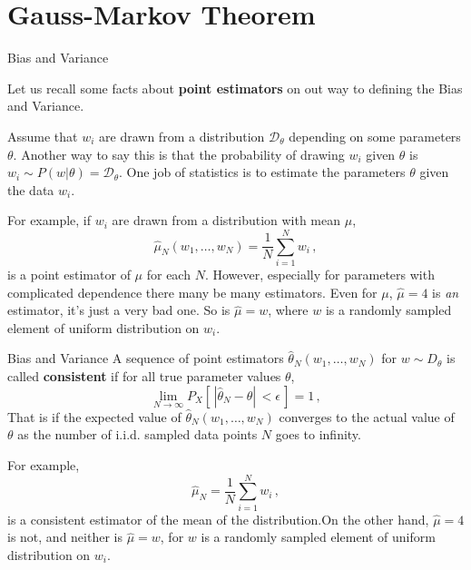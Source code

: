 \documentclass[10pt, table, dvipsnames,xcdraw,handout]{beamer}
\begin{document}
\section{Gauss-Markov Theorem}







\begin{frame}[fragile]{Bias and Variance} 

Let us recall some facts about \textbf{point estimators} on out way to defining the Bias and Variance. 

Assume that $w_i$ are drawn from a distribution $\mathcal{D}_\theta$ depending on some parameters $\theta$. Another way to say this is that the probability of drawing $w_i$ given $\theta$ is $w_i \sim P(w|\theta) =\mathcal{D}_\theta$. One job of statistics is to estimate the parameters $\theta$ given the data $w_i$. 

For example, if $w_i$ are drawn from a distribution with mean $\mu$,
$$
\hat{\mu}_N(w_1,\ldots, w_N) = \frac{1}{N} \sum_{i=1}^N w_i\,,
$$
is a point estimator of $\mu$ for each $N$. However, especially for parameters with complicated dependence there many be many estimators. Even for $\mu$, $\hat{\mu} = 4$ is \emph{an} estimator, it's just a very bad one. So is $\hat{\mu} = w$, where $w$ is a randomly sampled element of uniform distribution on $w_i$. 
 
\end{frame}



\begin{frame}[fragile]{Bias and Variance} 
A sequence of point estimators $\hat{\theta}_N(w_1,\ldots, w_N)$ for $w\sim D_\theta$ is called \textbf{consistent} if for all true parameter values $\theta$,
$$
\lim_{N\to \infty} P_X[\,| \hat{\theta}_N - \theta|\,<\epsilon\,] = 1\,,
$$
That is if the expected value of $\hat{\theta}_N(w_1,\ldots, w_N)$ converges to the actual value of $\theta$ as the number of i.i.d. sampled data points $N$ goes to infinity. \pause

For example, 
$$
\hat{\mu}_N = \frac{1}{N} \sum_{i=1}^N w_i\,,
$$
is a consistent estimator of the mean of the distribution.\pause On the other hand, $\hat{\mu} = 4$ is not, and neither is $\hat{\mu} = w$, for $w$ is a randomly sampled element of uniform distribution on $w_i$.
\end{frame}
\end{document}
